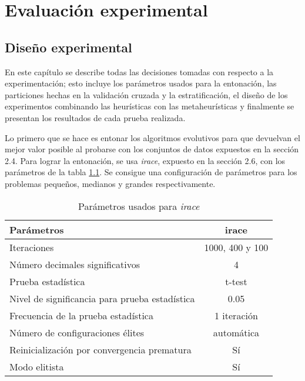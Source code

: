 \chapter{Evaluación experimental}
\label{capitulo3}

\section{Diseño experimental}

En este capítulo se describe todas las decisiones tomadas con respecto a la experimentación; esto incluye los parámetros usados para la entonación, las particiones hechas en la validación cruzada y la estratificación, el diseño de los experimentos combinando las heurísticas con las metaheurísticas y finalmente se presentan los resultados de cada prueba realizada. 

Lo primero que se hace es entonar los algoritmos evolutivos para que devuelvan el mejor valor posible al probarse con los conjuntos de datos expuestos en la sección 2.4. Para lograr la entonación, se usa \emph{irace}, expuesto en la sección 2.6, con los parámetros de la tabla \ref{irace-param}. Se consigue una configuración de parámetros para los problemas pequeños, medianos y grandes respectivamente.

\begin{table}[]
\centering
\begin{tabular}{l c}
\hline
Parámetros & irace \\
\hline
\hline
Iteraciones                                 &  1000, 400 y 100\\
Número decimales significativos             &    4            \\
Prueba estadística                          &  t-test         \\
Nivel de significancia para prueba estadística  &  0.05           \\
Frecuencia de la prueba estadística         &    1 iteración  \\
Número de configuraciones élites            &  automática     \\
Reinicialización por convergencia prematura &     Sí          \\
Modo elitista                               &     Sí          \\

\hline
\end{tabular}
\caption{Parámetros usados para \emph{irace}}
\label{irace-param}
\end{table}

